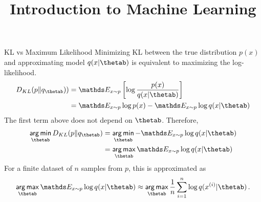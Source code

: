 



\newcommand{\titlefigure}{figure_man/multinoulli.png}
\newcommand{\learninggoals}{
  \item Minimizing KL is equivalent to maximizing the log-likelihod
  \item Minimizing KL is equivalent to minimizinig cross-entropy
  \item Minimizing cross-entropy between modeled and observed probabilities is equivalent to log-loss minimization
}

\title{Introduction to Machine Learning}
\date{}






\begin{vbframe}{KL vs Maximum Likelihood}
Minimizing KL between the true distribution $p(x)$ and approximating model $q(x|\thetab)$ is equivalent to maximizing the log-likelihood.
  \begin{align*}
    D_{KL}(p \| q_{\thetab})) &= \E_{x \sim p} \left[ \log \frac{p(x)}{q(x|\thetab)}\right] \\
     &= \E_{x \sim p} \log p(x) - \E_{x \sim p} \log q(x|\thetab)
  \end{align*}
  The first term above does not depend on $\thetab$. Therefore,
  \begin{align*}
    \argmin_{\thetab} D_{KL}(p \| q_{\thetab}) &= \argmin_{\thetab} -\E_{x \sim p} \log q(x|\thetab)\\ 
                                           &= \argmax_{\thetab} \E_{x \sim p} \log q(x|\thetab)
  \end{align*}
  For a finite dataset of $n$ samples from $p$, this is approximated as 
  $$\argmax_{\thetab} \E_{x \sim p} \log q(x|\thetab) \approx \argmax_{\thetab} \frac{1}{n} \sumin \log q(\xi|\thetab)\,.$$

\end{vbframe}

